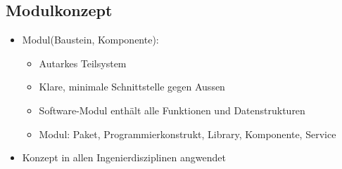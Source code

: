 \documentclass[../ZF_SWEN1.tex]{subfiles}
\begin{document}
\subsection{Modulkonzept}
\begin{itemize}
	\item Modul(Baustein, Komponente):
	\begin{itemize}
		\item Autarkes Teilsystem
		\item Klare, minimale Schnittstelle gegen Aussen
		\item Software-Modul enthält alle Funktionen und Datenstrukturen
		\item Modul: Paket, Programmierkonstrukt, Library, Komponente, Service
	\end{itemize}
	\item Konzept in allen Ingenierdisziplinen angwendet
	
\end{itemize}

\end{document}
